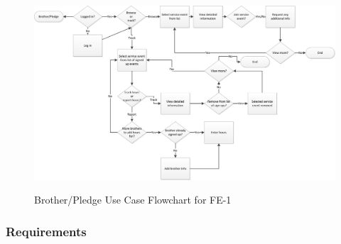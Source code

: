 \documentclass{article}
\begin{document}
\newpage

\newpage

\FloatBarrier
\begin{figure}
\centering
\caption{Brother/Pledge Use Case Flowchart for FE-1}
\includegraphics[scale=.75]{img/brotherUseCaseFE1.png}
\label{fig:brotherUseCaseFE1}
\end{figure}
\FloatBarrier

\newpage

\subsubsection{Requirements}
\end{document}
